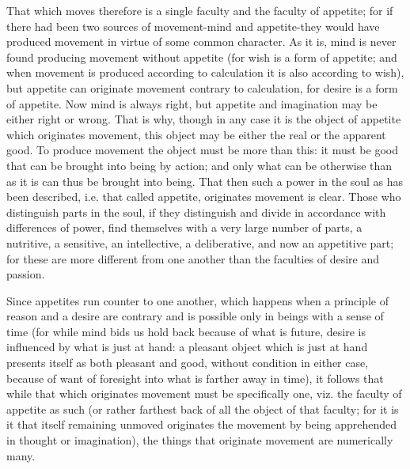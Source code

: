 That which moves therefore is a single faculty and the faculty of
appetite; for if there had been two sources of movement-mind and appetite-they
would have produced movement in virtue of some common character. As
it is, mind is never found producing movement without appetite (for
wish is a form of appetite; and when movement is produced according
to calculation it is also according to wish), but appetite can originate
movement contrary to calculation, for desire is a form of appetite.
Now mind is always right, but appetite and imagination may be either
right or wrong. That is why, though in any case it is the object of
appetite which originates movement, this object may be either the
real or the apparent good. To produce movement the object must be
more than this: it must be good that can be brought into being by
action; and only what can be otherwise than as it is can thus be brought
into being. That then such a power in the soul as has been described,
i.e. that called appetite, originates movement is clear. Those who
distinguish parts in the soul, if they distinguish and divide in accordance
with differences of power, find themselves with a very large number
of parts, a nutritive, a sensitive, an intellective, a deliberative,
and now an appetitive part; for these are more different from one
another than the faculties of desire and passion. 

Since appetites run counter to one another, which happens when a principle
of reason and a desire are contrary and is possible only in beings
with a sense of time (for while mind bids us hold back because of
what is future, desire is influenced by what is just at hand: a pleasant
object which is just at hand presents itself as both pleasant and
good, without condition in either case, because of want of foresight
into what is farther away in time), it follows that while that which
originates movement must be specifically one, viz. the faculty of
appetite as such (or rather farthest back of all the object of that
faculty; for it is it that itself remaining unmoved originates the
movement by being apprehended in thought or imagination), the things
that originate movement are numerically many. 

